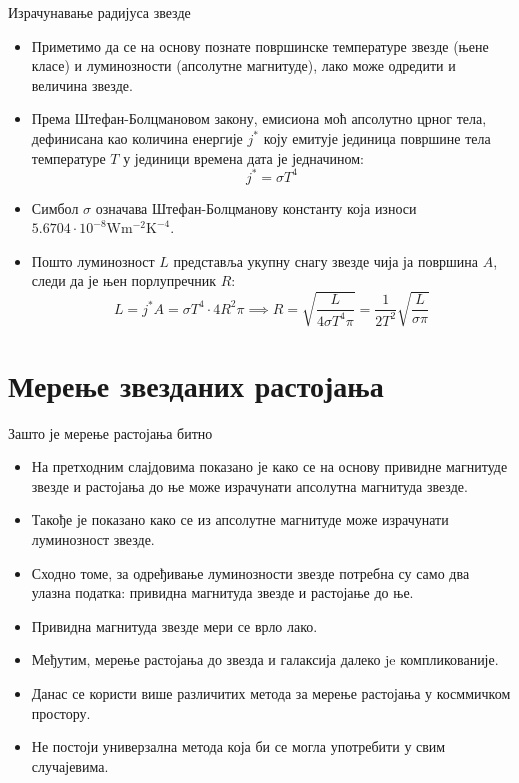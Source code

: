 \documentclass[aspectratio=169, xcolor=table, 10pt]{beamer}
\begin{document}
\begin{frame}{Израчунавање радијуса звезде}
  \begin{itemize}
    \item Приметимо да се на основу познате површинске температуре звезде (њене класе) и луминозности (апсолутне магнитуде), лако може одредити и величина звезде.
    \item Према Штефан-Болцмановом закону, емисиона моћ апсолутно црног тела, дефинисана као количина енергије $j^*$ коју емитује јединица површине тела температуре $T$ у јединици времена дата је једначином:
      \begin{equation*}
        j^*=\sigma T^4
      \end{equation*}
    \item Симбол $\sigma$ означава Штефан-Болцманову константу која износи $5.6704\cdot 10^{-8}\textrm{W}\textrm{m}^{-2}\textrm{K}^{-4}$.
    \item Пошто луминозност $L$ представља укупну снагу звезде чија ја површина $A$, следи да је њен порлупречник $R$:
      \begin{equation*}
        L=j^*A=\sigma T^4 \cdot 4R^2\pi\implies R=\sqrt{\frac{L}{4\sigma T^4\pi}}=\frac{1}{2T^2}\sqrt{\frac{L}{\sigma\pi}}
      \end{equation*}
  \end{itemize}
\end{frame}

\section{Мерење звезданих растојања}

\begin{frame}{Зашто је мерење растојања битно}
  \begin{itemize}
    \item На претходним слајдовима показано је како се на основу привидне магнитуде звезде и растојања до ње може израчунати апсолутна магнитуда звезде.
    \item Такође је показано како се из апсолутне магнитуде може израчунати луминозност звезде.
    \item Сходно томе, за одређивање луминозности звезде потребна су само два улазна податка: привидна магнитуда звезде и растојање до ње.
    \item Привидна магнитуда звезде мери се врло лако.
    \item Међутим, мерење растојања до звезда и галаксија далеко je компликованије.
    \item Данас се користи више различитих метода за мерење растојања у косммичком простору.
    \item Не постоји универзална метода која би се могла употребити у свим случајевима.
  \end{itemize}
\end{frame}
\end{document}
